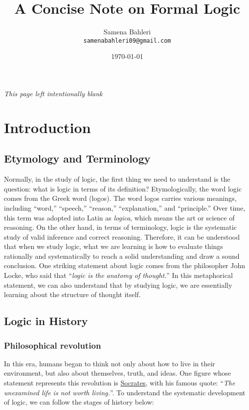 \documentclass[12pt,a4paper,openany]{article}
\title{A Concise Note on Formal Logic}
\author{Samena Bahleri \hspace{5pt}\\
\texttt{samenabahleri09@gmail.com}}
\date{\today}
\begin{document}
\maketitle

\newpage
\thispagestyle{empty} 
\vspace*{\fill} 
\begin{center}
    \textit{\small This page left intentionally blank}
\end{center}
\vspace*{\fill} 
\newpage

\tableofcontents
\newpage

\section{Introduction}

\subsection{Etymology and Terminology}\label{etymology-and-terminology}
Normally, in the study of logic, the first thing we need to understand
is the question: what is logic in terms of its definition?
Etymologically, the word logic comes from the Greek word (logos).
The word logos carries various meanings, including ``word,'' ``speech,''
``reason,'' ``explanation,'' and ``principle.'' Over time, this term was
adopted into Latin as \emph{logica}, which means the art or science of
reasoning. On the other hand, in terms of terminology, logic is the
systematic study of valid inference and correct reasoning. Therefore, it
can be understood that when we study logic, what we are learning is how
to evaluate things rationally and systematically to reach a solid
understanding and draw a sound conclusion. One striking statement about
logic comes from the philosopher John Locke, who said that ``\textit{logic is
the anatomy of thought.}'' In this metaphorical statement, we can also
understand that by studying logic, we are essentially learning about the
structure of thought itself.

\subsection{Logic in History}\label{logic-in-history}

\subsubsection{Philosophical revolution}\label{philosophical-revolution}
In this era, humans began to think not only about how to live in their
environment, but also about themselves, truth, and ideas. One figure
whose statement represents this revolution is
\href{https://en.wikipedia.org/wiki/Socrates}{Socrates}, with his famous
quote: ``\textit{The unexamined life is not worth living.}''. To understand the
systematic development of logic, we can follow the stages of history
below:
\end{document}

